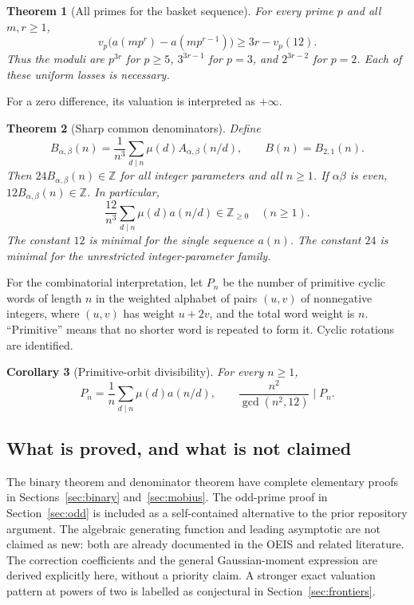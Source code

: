 \documentclass[11pt,a4paper]{article}
\numberwithin{equation}{section}
\newtheorem{theorem}{Theorem}[section]
\newtheorem{corollary}[theorem]{Corollary}
\theoremstyle{definition}
\theoremstyle{remark}
\newcommand{\Z}{\mathbb Z}
\newcommand{\A}{A_{\alpha,\beta}}
\newcommand{\B}{B_{\alpha,\beta}}
\begin{document}
\begin{theorem}[All primes for the basket sequence]\label{thm:allprime}
For every prime $p$ and all $m,r\ge1$,
\begin{equation}\label{eq:all-prime}
 v_p\bigl(a(mp^r)-a(mp^{r-1})\bigr)
 \ge 3r-v_p(12).
\end{equation}
Thus the moduli are $p^{3r}$ for $p\ge5$, $3^{3r-1}$ for $p=3$, and
$2^{3r-2}$ for $p=2$. Each of these uniform losses is necessary.
\end{theorem}

For a zero difference, its valuation is interpreted as $+\infty$.

\begin{theorem}[Sharp common denominators]\label{thm:denom}
Define
\begin{equation}\label{eq:Bn}
 \B(n)=\frac1{n^3}\sum_{d\mid n}\mu(d)\A(n/d),\qquad
 B(n)=B_{2,1}(n).
\end{equation}
Then $24\B(n)\in\Z$ for all integer parameters and all $n\ge1$.
If $\alpha\beta$ is even, $12\B(n)\in\Z$. In particular,
\begin{equation}\label{eq:denom12}
 \boxed{\quad
 \frac{12}{n^3}\sum_{d\mid n}\mu(d)a(n/d)\in\Z_{\ge0}
 \quad(n\ge1).\quad}
\end{equation}
The constant $12$ is minimal for the single sequence $a(n)$. The constant
$24$ is minimal for the unrestricted integer-parameter family.
\end{theorem}

For the combinatorial interpretation, let $P_n$ be the number of primitive
cyclic words of length $n$ in the weighted alphabet of pairs $(u,v)$ of
nonnegative integers, where $(u,v)$ has weight $u+2v$, and the total word
weight is $n$. ``Primitive'' means that no shorter word is repeated to form
it. Cyclic rotations are identified.

\begin{corollary}[Primitive-orbit divisibility]\label{cor:necklace}
For every $n\ge1$,
\begin{equation}\label{eq:necklace-div}
 P_n=\frac1n\sum_{d\mid n}\mu(d)a(n/d),\qquad
 \frac{n^2}{\gcd(n^2,12)}\mid P_n.
\end{equation}
\end{corollary}

\subsection{What is proved, and what is not claimed}
The binary theorem and denominator theorem have complete elementary proofs
in Sections~\ref{sec:binary} and~\ref{sec:mobius}. The odd-prime proof in
Section~\ref{sec:odd} is included as a self-contained alternative to the
prior repository argument. The algebraic generating function and leading
asymptotic are not claimed as new: both are already documented in the OEIS
and related literature. The correction coefficients and the general
Gaussian-moment expression are derived explicitly here, without a priority
claim. A stronger exact valuation pattern at powers of two is labelled as
conjectural in Section~\ref{sec:frontiers}.
\end{document}
